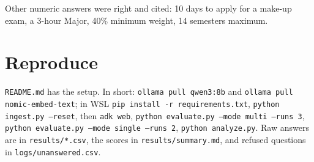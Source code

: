 \documentclass[10pt,a4paper]{article}
\newcommand{\code}[1]{\texttt{\small #1}}
\begin{document}
Other numeric answers were right and cited: 10 days to apply for a make-up exam, a 3-hour Major, 40\% minimum weight, 14 semesters maximum.

\section{Reproduce}

\code{README.md} has the setup. In short: \code{ollama pull qwen3:8b} and \code{ollama pull nomic-embed-text}; in WSL \code{pip install -r requirements.txt}, \code{python ingest.py --reset}, then \code{adk web}, \code{python evaluate.py --mode multi --runs 3}, \code{python evaluate.py --mode single --runs 2}, \code{python analyze.py}. Raw answers are in \code{results/*.csv}, the scores in \code{results/summary.md}, and refused questions in \code{logs/unanswered.csv}.
\end{document}
